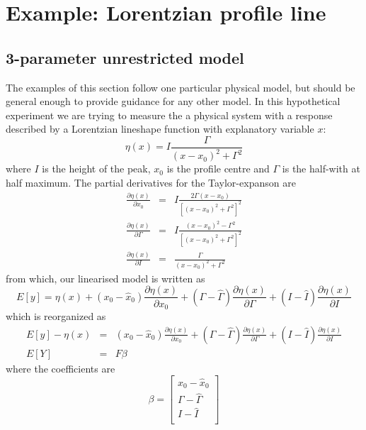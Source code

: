 \documentclass[12pt]{iopart}
\begin{document}
\section{Example: Lorentzian profile line}
\label{seq:example}

\subsection{3-parameter unrestricted model}
\label{seq:exopt}

The examples of this section follow one particular physical model, but should be general enough to provide guidance for any other model.
In this hypothetical experiment we are trying to measure the a physical system with a response described by a Lorentzian lineshape function with explanatory variable $x$:
\begin{equation}
\eta(x) = I \frac{\Gamma}{(x - x_0)^2 + \Gamma^2}
\label{eq:lorentz3}
\end{equation}
where $I$ is the height of the peak, $x_0$ is the profile centre and $\Gamma$ is the half-with at half maximum. The partial derivatives for the Taylor-expanson are
\begin{eqnarray}
\frac{\partial \eta(x)}{\partial x_0} &=& I \frac{2 \Gamma (x - x_0)}{\left[(x - x_0)^2 + \Gamma^2\right]^2} \\
\frac{\partial \eta(x)}{\partial \Gamma} &=& I \frac{(x - x_0)^2 - \Gamma^2}{\left[(x - x_0)^2 + \Gamma^2\right]^2} \\
\frac{\partial \eta(x)}{\partial I} &=& \frac{\Gamma}{(x - x_0)^2 + \Gamma^2}
\end{eqnarray}
from which, our linearised model is written as
\begin{equation}
E[y] = \eta(x) + (x_0 - \hat x_0) \frac{\partial \eta(x)}{\partial x_0} + (\Gamma - \hat \Gamma) \frac{\partial \eta(x)}{\partial \Gamma} + (I - \hat I) \frac{\partial \eta(x)}{\partial I}
\end{equation}
which is reorganized as
\begin{eqnarray}
E[y] - \eta(x) &=& (x_0 - \hat x_0) \frac{\partial \eta(x)}{\partial x_0} + (\Gamma - \hat \Gamma) \frac{\partial \eta(x)}{\partial \Gamma} + (I - \hat I) \frac{\partial \eta(x)}{\partial I}  \nonumber \\
E[Y] &=& F \beta
\end{eqnarray}
where the coefficients are
\begin{equation}
\beta = \left[
  \begin{array}{l}
    x_0 - \hat x_0 \\
    \Gamma - \hat \Gamma\\
    I - \hat I \\
  \end{array} \right ]
\end{equation}
\end{document}
